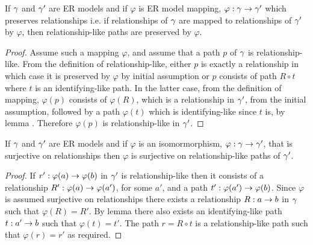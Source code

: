 \begin{lemma}
If $\gamma$ and $\gamma'$ are ER models and  if  $\varphi$ is ER model mapping, $\varphi: \gamma \rightarrow \gamma'$  which preserves relationships  i.e. if relationships of $\gamma$ are mapped to relationships of $\gamma'$ by  $\varphi$, then relationship-like paths are preserved by $\varphi$.
\end{lemma}
\begin{proof}
Assume such a mapping $\varphi$, and assume that a path $p$ of $\gamma$ is relationship-like.
From the definition of relationship-like, either $p$ is exactly a relationship in which case it is preserved by $\varphi$ by initial assumption or $p$ consists of path $R \circ t$ where $t$ is an identifying-like path.
In the latter case, from the definition of mapping, $\varphi(p)$ consists of $\varphi(R)$, which is a relationship in $\gamma'$, from the initial assumption, followed by a path $\varphi(t)$ which is identifying-like since $t$ is, by lemma . Therefore $\varphi(p)$ is relationship-like in $\gamma'$.
\end{proof}

\begin{lemma}
If $\gamma$ and $\gamma'$ are ER models and  if  $\varphi$ is an isomormorphism, $\varphi: \gamma \rightarrow \gamma'$, that is surjective on relationships    
then $\varphi$ is surjective on relationship-like paths of $\gamma'$. 
\end{lemma}
\begin{proof}
If $r':\varphi(a) \rightarrow \varphi(b)$ in $\gamma'$ is relationship-like then it consists of a relationship $R': \varphi(a) \rightarrow \varphi(a')$, for some $a'$,
and a path $t':\varphi(a') \rightarrow \varphi(b)$. Since $\varphi$ is assumed surjective on relationships there exists a relationship 
$R:a \rightarrow b$ in $\gamma$ such that $\varphi(R)=R'$. 
By lemma  there also exists an identifying-like path $t:a' \rightarrow b$ such that $\varphi(t)=t'$.
The path $r=R \circ t$ is a relationship-like path such that $\varphi(r)=r'$ as required.
\end{proof}

 

